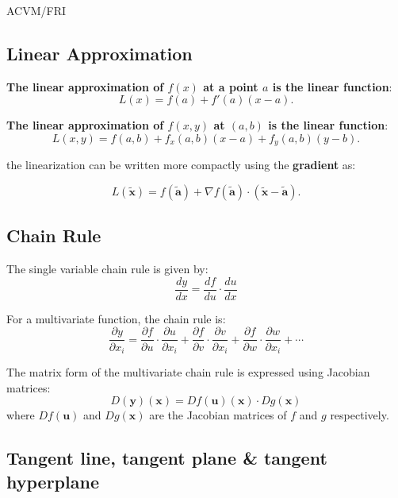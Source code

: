 \documentclass{article}
\begin{document}
\begin{center}
    {\small ACVM/FRI \par}
\end{center}

\begin{multicols}{2}

\section{Linear Approximation}

\textbf{The linear approximation of \( f(x) \) at a point \( a \) is the linear function}:
\[
L(x) = f(a) + f'(a)(x - a).
\]


\textbf{The linear approximation of \( f(x, y) \) at \( (a, b) \) is the linear function}:
\[
L(x, y) = f(a, b) + f_x(a, b)(x - a) + f_y(a, b)(y - b).
\]

the linearization can be written more compactly using the \textbf{gradient} as:

\[
L(\mathbf{\tilde{x}}) = f(\mathbf{\tilde{a}}) + \nabla f(\mathbf{\tilde{a}}) \cdot (\mathbf{\tilde{x}} - \mathbf{\tilde{a}}).
\]

\subsection{Chain Rule}

The single variable chain rule is given by:
\[
\frac{dy}{dx} = \frac{df}{du} \cdot \frac{du}{dx}
\]

For a multivariate function, the chain rule is:
\[
\frac{\partial y}{\partial x_i} = \frac{\partial f}{\partial u} \cdot \frac{\partial u}{\partial x_i} + \frac{\partial f}{\partial v} \cdot \frac{\partial v}{\partial x_i} + \frac{\partial f}{\partial w} \cdot \frac{\partial w}{\partial x_i} + \cdots
\]

The matrix form of the multivariate chain rule is expressed using Jacobian matrices:
\[
D(\mathbf{y})(\mathbf{x}) = Df(\mathbf{u})(\mathbf{x}) \cdot Dg(\mathbf{x})
\]
where \( Df(\mathbf{u}) \) and \( Dg(\mathbf{x}) \) are the Jacobian matrices of \( f \) and \( g \) respectively.

\subsection{Tangent line, tangent plane \& tangent hyperplane}


\end{multicols}
\end{document}
